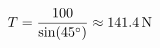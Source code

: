 \documentclass[preview]{standalone}
\begin{document}
\begin{align*}
\special{dvisvgm:raw <g id='unique000'>}T = \frac{100}{\sin(45^{\circ})} \approx 141.4\,\mathrm{N}\special{dvisvgm:raw </g>}
\end{align*}
\end{document}
